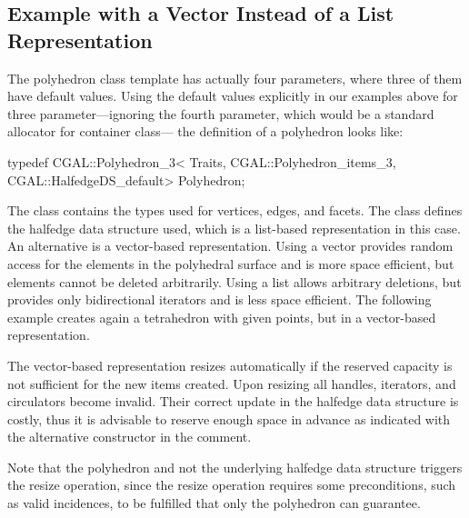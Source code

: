 \subsection{Example with a Vector Instead of a List Representation}
\label{sectionPolyVector}

The polyhedron class template has actually four parameters, where
three of them have default values. Using the default values explicitly
in our examples above for three parameter---ignoring the fourth
parameter, which would be a standard allocator for container class---
the definition of a polyhedron looks like:

\begin{ccExampleCode}
typedef CGAL::Polyhedron_3< Traits, 
                            CGAL::Polyhedron_items_3, 
                            CGAL::HalfedgeDS_default>      Polyhedron;
\end{ccExampleCode}

The  class contains the types used for
vertices, edges, and facets. The  class
defines the halfedge data structure used, which is a list-based
representation in this case. An alternative is a vector-based
representation. Using a vector provides random
access for the elements in the polyhedral surface and is more space
efficient, but elements cannot be deleted arbitrarily. Using a list
allows arbitrary deletions, but provides only bidirectional iterators
and is less space efficient. The following example creates again a 
tetrahedron with given points, but in a vector-based representation.

The vector-based representation resizes automatically if the reserved
capacity is not sufficient for the new items created. Upon resizing
all handles, iterators, and circulators become invalid. Their correct
update in the halfedge data structure is costly, thus it is advisable
to reserve enough space in advance as indicated with the alternative
constructor in the comment. 

\begin{ccAdvanced}
Note that the polyhedron and not the underlying halfedge data
structure triggers the resize operation, since the resize operation
requires some preconditions, such as valid incidences, to be fulfilled
that only the polyhedron can guarantee.
\end{ccAdvanced}



